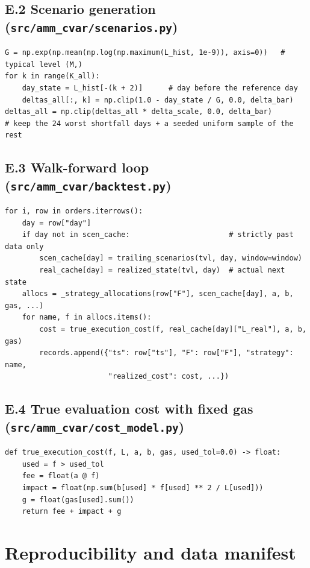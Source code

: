 \documentclass[11pt,a4paper]{article}
\theoremstyle{remark}
\newcommand{\code}[1]{\texttt{#1}}
\begin{document}
\subsection*{E.2 Scenario generation (\code{src/amm\_cvar/scenarios.py})}
\begin{lstlisting}[style=pystyle]
G = np.exp(np.mean(np.log(np.maximum(L_hist, 1e-9)), axis=0))   # typical level (M,)
for k in range(K_all):
    day_state = L_hist[-(k + 2)]      # day before the reference day
    deltas_all[:, k] = np.clip(1.0 - day_state / G, 0.0, delta_bar)
deltas_all = np.clip(deltas_all * delta_scale, 0.0, delta_bar)
# keep the 24 worst shortfall days + a seeded uniform sample of the rest
\end{lstlisting}

\subsection*{E.3 Walk-forward loop (\code{src/amm\_cvar/backtest.py})}
\begin{lstlisting}[style=pystyle]
for i, row in orders.iterrows():
    day = row["day"]
    if day not in scen_cache:                       # strictly past data only
        scen_cache[day] = trailing_scenarios(tvl, day, window=window)
        real_cache[day] = realized_state(tvl, day)  # actual next state
    allocs = _strategy_allocations(row["F"], scen_cache[day], a, b, gas, ...)
    for name, f in allocs.items():
        cost = true_execution_cost(f, real_cache[day]["L_real"], a, b, gas)
        records.append({"ts": row["ts"], "F": row["F"], "strategy": name,
                        "realized_cost": cost, ...})
\end{lstlisting}

\subsection*{E.4 True evaluation cost with fixed gas (\code{src/amm\_cvar/cost\_model.py})}
\begin{lstlisting}[style=pystyle]
def true_execution_cost(f, L, a, b, gas, used_tol=0.0) -> float:
    used = f > used_tol
    fee = float(a @ f)
    impact = float(np.sum(b[used] * f[used] ** 2 / L[used]))
    g = float(gas[used].sum())
    return fee + impact + g
\end{lstlisting}

\section{Reproducibility and data manifest}
\label{app:repro}
\end{document}
